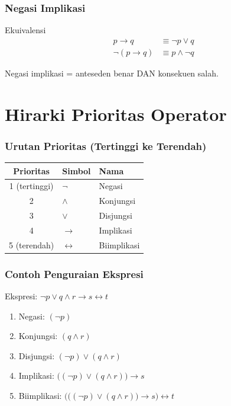 \documentclass[handout]{beamer}
\theoremstyle{definition}
\theoremstyle{example}
\begin{document}
\begin{frame}
\frametitle{Negasi Implikasi}
\begin{block}{Ekuivalensi}
\begin{align*}
p \rightarrow q &\equiv \neg p \vee q \\
\neg(p \rightarrow q) &\equiv p \wedge \neg q
\end{align*}
\end{block}
Negasi implikasi = anteseden benar DAN konsekuen salah.
\end{frame}

\section{Hirarki Prioritas Operator}

\begin{frame}
\frametitle{Urutan Prioritas (Tertinggi ke Terendah)}
\begin{table}
\small
\begin{tabular}{|c|l|l|}
\hline
\textbf{Prioritas} & \textbf{Simbol} & \textbf{Nama} \\ \hline
1 (tertinggi) & $\neg$ & Negasi \\ \hline
2 & $\wedge$ & Konjungsi \\ \hline
3 & $\vee$ & Disjungsi \\ \hline
4 & $\rightarrow$ & Implikasi \\ \hline
5 (terendah) & $\leftrightarrow$ & Biimplikasi \\ \hline
\end{tabular}
\end{table}
\end{frame}

\begin{frame}
\frametitle{Contoh Penguraian Ekspresi}
\begin{block}{Ekspresi: $\neg p \vee q \wedge r \rightarrow s \leftrightarrow t$}
\begin{enumerate}
  \item Negasi: $(\neg p)$
  \item Konjungsi: $(q \wedge r)$
  \item Disjungsi: $(\neg p) \vee (q \wedge r)$
  \item Implikasi: $\big((\neg p) \vee (q \wedge r)\big) \rightarrow s$
  \item Biimplikasi: $\Big(\big((\neg p) \vee (q \wedge r)\big) \rightarrow s\Big) \leftrightarrow t$
\end{enumerate}
\end{block}
\end{frame}
\end{document}
